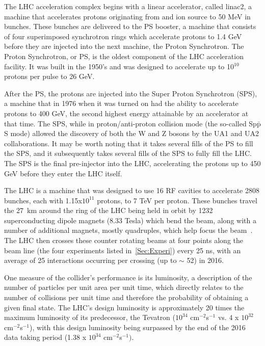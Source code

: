 The LHC acceleration complex begins with a linear accelerator, called linac2, a machine that accelerates protons originating from and ion source to 50 MeV in bunches.  
These bunches are delivered to the PS booster, a machine that consists of four superimposed synchrotron rings which accelerate protons to 1.4 GeV before they are injected into the next machine, the Proton Synchrotron.  
The Proton Synchrotron, or PS, is the oldest component of the LHC acceleration facility.  
It was built in the 1950's and was designed to accelerate up to 10$^{10}$ protons per pulse to 26 GeV.

After the PS, the protons are injected into the Super Proton Synchrotron (SPS), a machine that in 1976 when it was turned on had the ability to accelerate protons to 400 GeV, the second highest energy attainable by an accelerator at that time.  
The SPS, while in proton/anti-proton collision mode (the so-called Sp$\bar{\mathrm p}$S mode) allowed the discovery of both the W and Z bosons by the UA1 and UA2 collaborations.  
It may be worth noting that it takes several fills of the PS to fill the SPS, and it subsequently takes several fills of the SPS to fully fill the LHC.  
The SPS is the final pre-injector into the LHC, accelerating the protons up to 450 GeV before they enter the LHC itself.  

The LHC is a machine that was designed to use 16 RF cavities to accelerate 2808 bunches, each with 1.15x$10^{11}$ protons, to 7 TeV per proton.  
These bunches travel the 27~km around the ring of the LHC being held in orbit by 1232 superconducting dipole magnets (8.33 Tesla) which bend the beam, along with a number of additional magnets, mostly quadruples, which help focus the beam~\cite{LHCTDR}.  
The LHC then crosses these counter rotating beams at four points along the beam line (the four experiments listed in~\ref{Sec:Experi}) every 25 ns, with an average of 25 interactions occurring per crossing (up to $\sim$ 52) in 2016. 

One measure of the collider's performance is its luminosity, a description of the number of particles per unit area per unit time, which directly relates to the number of collisions per unit time and therefore the probability of obtaining a given final state.  
The LHC's design luminosity is approximately 20 times the maximum luminosity of its predecessor, the Tevatron ($10^{34}$ cm$^{-2}$s$^{-1}$ vs. 4 x $10^{32}$ cm$^{-2}$s$^{-1}$), with this design luminosity being surpassed by the end of the 2016 data taking period (1.38 x $10^{34}$ cm$^{-2}$s$^{-1})$. 

